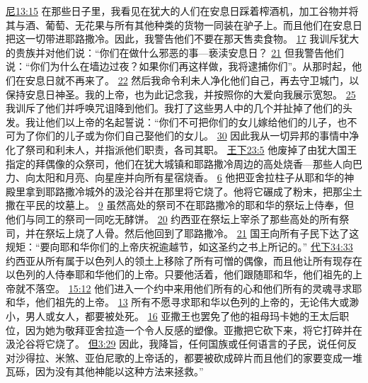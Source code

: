 \documentclass[12pt, a4paper, oneside]{ctexart}
\begin{document}
{		\href{https://biblehub.com/nehemiah/13-15.htm}{尼13:15} 在那些日子里，我看见在犹大的人们在安息日踩着榨酒机，加工谷物并将其与酒、葡萄、无花果与所有其他种类的货物一同装在驴子上。而且他们在安息日把这一切带进耶路撒冷。因此，我警告他们不要在那天售卖食物。
		\href{https://biblehub.com/nehemiah/13-17.htm}{17} 我训斥犹大的贵族并对他们说：“你们在做什么邪恶的事---亵渎安息日？
		\href{https://biblehub.com/nehemiah/13-21.htm}{21} 但我警告他们说：“你们为什么在墙边过夜？如果你们再这样做，我将逮捕你们”。从那时起，他们在安息日就不再来了。
		\href{https://biblehub.com/nehemiah/13-22.htm}{22} 然后我命令利未人净化他们自己，再去守卫城门，以保持安息日神圣。我的上帝，也为此记念我，并按照你的大爱向我展示宽恕。
		\href{https://biblehub.com/nehemiah/13-25.htm}{25} 我训斥了他们并呼唤咒诅降到他们。我打了这些男人中的几个并扯掉了他们的头发。我让他们以上帝的名起誓说：“你们不可把你们的女儿嫁给他们的儿子，也不可为了你们的儿子或为你们自己娶他们的女儿。
		\href{https://biblehub.com/nehemiah/13-30.htm}{30} 因此我从一切异邦的事情中净化了祭司和利未人，并指派他们职责，各司其职。
		\href{https://biblehub.com/2_kings/23-5.htm}{王下23:5} 他废掉了由犹大国王指定的拜偶像的众祭司，他们在犹大城镇和耶路撒冷周边的高处烧香---那些人向巴力、向太阳和月亮、向星座并向所有星宿烧香。
		\href{https://biblehub.com/2_kings/23-6.htm}{6} 他把亚舍拉柱子从耶和华的神殿里拿到耶路撒冷城外的汲沦谷并在那里将它烧了。他将它碾成了粉末，把那尘土撒在平民的坟墓上。
		\href{https://biblehub.com/2_kings/23-9.htm}{9} 虽然高处的祭司不在耶路撒冷的耶和华的祭坛上侍奉，但他们与同工的祭司一同吃无酵饼。
		\href{https://biblehub.com/2_kings/23-20.htm}{20} 约西亚在祭坛上宰杀了那些高处的所有祭司，并在祭坛上烧了人骨。然后他回到了耶路撒冷。
		\href{https://biblehub.com/2_kings/23-21.htm}{21} 国王向所有子民下达了这规矩：“要向耶和华你们的上帝庆祝逾越节，如这圣约之书上所记的。”
		\href{https://biblehub.com/2_chronicles/34-33.htm}{代下34:33} 约西亚从所有属于以色列人的领土上移除了所有可憎的偶像，而且他让所有现存在以色列的人侍奉耶和华他们的上帝。只要他活着，他们跟随耶和华，他们祖先的上帝就不落空。
		\href{https://biblehub.com/2_chronicles/15-12.htm}{15:12} 他们进入一个约中来用他们所有的心和他们所有的灵魂寻求耶和华，他们祖先的上帝。
		\href{https://biblehub.com/2_chronicles/15-13.htm}{13} 所有不愿寻求耶和华以色列的上帝的，无论伟大或渺小，男人或女人，都要被处死。
		\href{https://biblehub.com/2_chronicles/15-16.htm}{16} 亚撒王也罢免了他的祖母玛卡她的王太后职位，因为她为敬拜亚舍拉造一个令人反感的塑像。亚撒把它砍下来，将它打碎并在汲沦谷将它烧了。
		\href{https://biblehub.com/daniel/3-29.htm}{但3:29} 因此，我降旨，任何国族或任何语言的子民，说任何反对沙得拉、米煞、亚伯尼歌的上帝话的，都要被砍成碎片而且他们的家要变成一堆瓦砾，因为没有其他神能以这种方法来拯救。”
}
\end{document}
